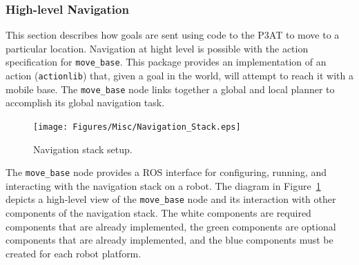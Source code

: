 \subsubsection*{High-level Navigation}
This section describes how goals are sent using code to the P3AT to move to a particular location. Navigation at hight level is possible with the action specification for \texttt{move\_base}. This package provides an implementation of an action (\texttt{actionlib}) that, given a goal in the world, will attempt to reach it with a mobile base. The \texttt{move\_base} node links together a global and local planner to accomplish its global navigation task. 

\begin{figure}[h!]
\centering
\texttt{[image: Figures/Misc/Navigation\_Stack.eps]}
\caption{Navigation stack setup.}\label{fig:navigation_stack}
\end{figure}
The \texttt{move\_base} node provides a ROS interface for configuring, running, and interacting with the navigation stack on a robot. The diagram in Figure~\ref{fig:navigation_stack} depicts a high-level view of the \texttt{move\_base} node and its interaction with other components of the navigation stack. The white components are required components that are already implemented, the green components are optional components that are already implemented, and the blue components must be created for each robot platform. 

